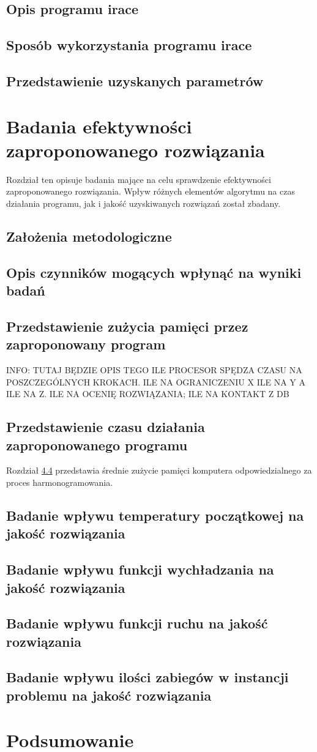 \section{Opis programu irace}
\section{Sposób wykorzystania programu irace}
\section{Przedstawienie uzyskanych parametrów}


\chapter{Badania efektywności zaproponowanego rozwiązania}
Rozdział ten opisuje badania mające na celu sprawdzenie efektywności
zaproponowanego rozwiązania. Wpływ różnych elementów algorytmu na czas działania programu, jak i jakość
uzyskiwanych rozwiązań został zbadany.

\section{Założenia metodologiczne}
\section{Opis czynników mogących wpłynąć na wyniki badań}

\section{Przedstawienie zużycia pamięci przez zaproponowany program}
INFO: TUTAJ BĘDZIE OPIS TEGO ILE PROCESOR SPĘDZA CZASU NA POSZCZEGÓLNYCH KROKACH. ILE
NA OGRANICZENIU X ILE NA Y A ILE NA Z. ILE NA OCENIĘ ROZWIĄZANIA; ILE NA
KONTAKT Z DB

\section{Przedstawienie czasu działania zaproponowanego programu} \label{section:memory-usage}
Rozdział \ref{section:memory-usage} przedstawia średnie zużycie pamięci
komputera odpowiedzialnego za proces harmonogramowania.

\section{Badanie wpływu temperatury początkowej na jakość rozwiązania}
\section{Badanie wpływu funkcji wychładzania na jakość rozwiązania}
\section{Badanie wpływu funkcji ruchu na jakość rozwiązania}
\section{Badanie wpływu ilości zabiegów w instancji problemu na jakość rozwiązania}

\chapter{Podsumowanie}
